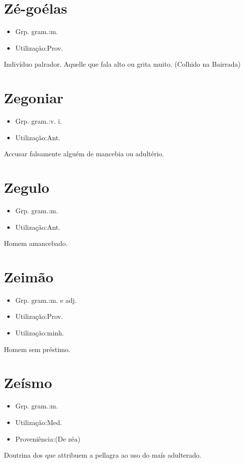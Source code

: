 \section{Zé-goélas}
\begin{itemize}
\item {Grp. gram.:m.}
\end{itemize}
\begin{itemize}
\item {Utilização:Prov.}
\end{itemize}
Indivíduo palrador.
Aquelle que fala alto ou grita muito. (Colhido na Bairrada)
\section{Zegoniar}
\begin{itemize}
\item {Grp. gram.:v. i.}
\end{itemize}
\begin{itemize}
\item {Utilização:Ant.}
\end{itemize}
Accusar falsamente alguém de mancebia ou adultério.
\section{Zegulo}
\begin{itemize}
\item {Grp. gram.:m.}
\end{itemize}
\begin{itemize}
\item {Utilização:Ant.}
\end{itemize}
Homem amancebado.
\section{Zeimão}
\begin{itemize}
\item {Grp. gram.:m.  e  adj.}
\end{itemize}
\begin{itemize}
\item {Utilização:Prov.}
\end{itemize}
\begin{itemize}
\item {Utilização:minh.}
\end{itemize}
Homem sem préstimo.
\section{Zeísmo}
\begin{itemize}
\item {Grp. gram.:m.}
\end{itemize}
\begin{itemize}
\item {Utilização:Med.}
\end{itemize}
\begin{itemize}
\item {Proveniência:(De \textunderscore zéa\textunderscore )}
\end{itemize}
Doutrina dos que attribuem a pellagra ao uso do maís adulterado.

